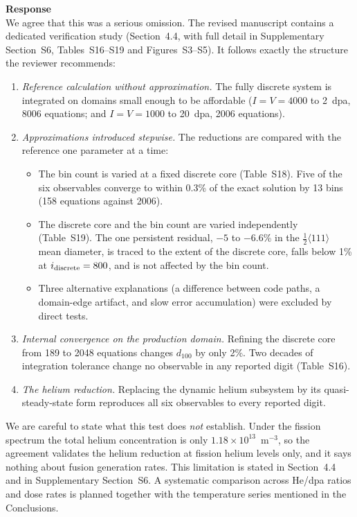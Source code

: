 \documentclass{article}
\newcommand{\hkl}[1]{\langle #1\rangle}
\newcommand{\half}{\tfrac{1}{2}}
\begin{document}
\begin{itemize}
\textbf{Response}\\
We agree that this was a serious omission. The revised manuscript contains a dedicated verification study (Section~4.4, with full detail in Supplementary Section~S6, Tables~S16--S19 and Figures~S3--S5). It follows exactly the structure the reviewer recommends:
\begin{enumerate}[label=(\alph*)]
    \item \emph{Reference calculation without approximation.} The fully discrete system is integrated on domains small enough to be affordable ($I=V=4000$ to 2~dpa, 8006 equations; and $I=V=1000$ to 20~dpa, 2006 equations).
    \item \emph{Approximations introduced stepwise.} The reductions are compared with the reference one parameter at a time:
    \begin{itemize}
        \item The bin count is varied at a fixed discrete core (Table~S18). Five of the six observables converge to within 0.3\% of the exact solution by 13 bins (158 equations against 2006).
        \item The discrete core and the bin count are varied independently (Table~S19). The one persistent residual, $-5$ to $-6.6$\% in the $\half\hkl{111}$ mean diameter, is traced to the extent of the discrete core, falls below 1\% at $i_{\rm discrete}=800$, and is not affected by the bin count.
        \item Three alternative explanations (a difference between code paths, a domain-edge artifact, and slow error accumulation) were excluded by direct tests.
    \end{itemize}
    \item \emph{Internal convergence on the production domain.} Refining the discrete core from 189 to 2048 equations changes $d_{100}$ by only 2\%. Two decades of integration tolerance change no observable in any reported digit (Table~S16).
    \item \emph{The helium reduction.} Replacing the dynamic helium subsystem by its quasi-steady-state form reproduces all six observables to every reported digit.
\end{enumerate}

We are careful to state what this test does \emph{not} establish. Under the fission spectrum the total helium concentration is only $1.18\times10^{13}$~m$^{-3}$, so the agreement validates the helium reduction at fission helium levels only, and it says nothing about fusion generation rates. This limitation is stated in Section~4.4 and in Supplementary Section~S6. A systematic comparison across He/dpa ratios and dose rates is planned together with the temperature series mentioned in the Conclusions.


\end{itemize}
\end{document}
